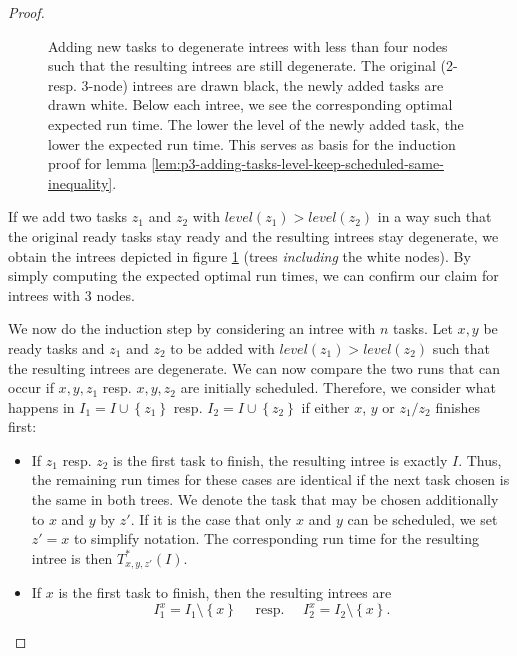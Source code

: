 \begin{proof}
\begin{figure}[t]
\begin{tikzpicture}[scale=0.25]
    \end{tikzpicture}
    \caption{Adding new tasks to degenerate intrees with less than four nodes such that the resulting intrees are still degenerate. The original (2- resp. 3-node) intrees are drawn black, the newly added tasks are drawn white. Below each intree, we see the corresponding optimal expected run time. The lower the level of the newly added task, the lower the expected run time. This serves as basis for the induction proof for lemma \ref{lem:p3-adding-tasks-level-keep-scheduled-same-inequality}.}
    \label{fig:p3-lemma-adding-intrees-induction-start}
  \end{figure}

  If we add two tasks $z_1$ and $z_2$ with $level(z_1)>level(z_2)$ in a way such that the original ready tasks stay ready and the resulting intrees stay degenerate, we obtain the intrees depicted in figure \ref{fig:p3-lemma-adding-intrees-induction-start} (trees \emph{including} the white nodes). By simply computing the expected optimal run times, we can confirm our claim for intrees with 3 nodes.

  We now do the induction step by considering an intree with $n$ tasks. 
  Let $x,y$ be ready tasks and $z_1$ and $z_2$ to be added with $level(z_1) > level(z_2)$ such that the resulting intrees are degenerate.
  We can now compare the two runs that can occur if $x,y,z_1$ resp. $x,y,z_2$ are initially scheduled. 
  Therefore, we consider what happens in $I_1=I\cup\left\{ z_1 \right\}$ resp. $I_2=I\cup\left\{ z_2 \right\}$ if either $x$, $y$ or $z_1/z_2$ finishes first:

  \begin{itemize}
  \item If $z_1$ resp. $z_2$ is the first task to finish, the resulting intree is exactly $I$. Thus, the remaining run times for these cases are identical if the next task chosen is the same in both trees. We denote the task that may be chosen additionally to $x$ and $y$ by $z'$. If it is the case that only $x$ and $y$ can be scheduled, we set $z'=x$ to simplify notation. The corresponding run time for the resulting intree is then $T^*_{x,y,z'}(I)$.

  \item If $x$ is the first task to finish, then the resulting intrees are 
    \begin{equation*}
      I^x_{1}=I_1\setminus\left\{ x \right\} \quad \text{ resp. } \quad I^x_{2}=I_2\setminus\left\{ x \right\}.
    \end{equation*}


\end{itemize}
\end{proof}
